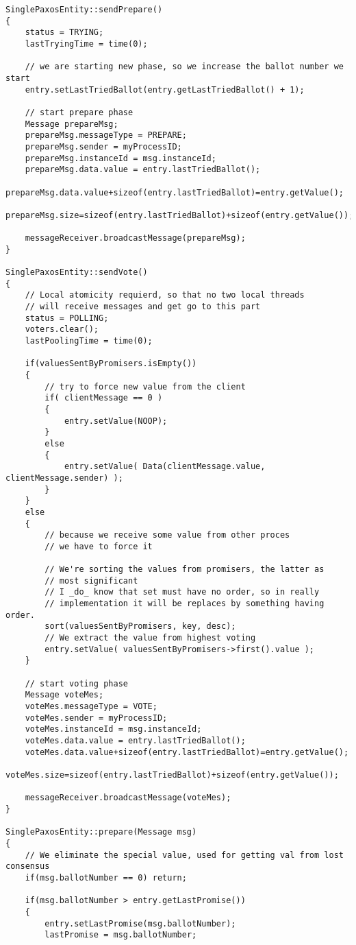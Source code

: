 {\begin{lstlisting}[frame=lines,caption=Pseudocode of Paxos algorithm]
SinglePaxosEntity::sendPrepare()
{
	status = TRYING;
	lastTryingTime = time(0);
	
	// we are starting new phase, so we increase the ballot number we start
	entry.setLastTriedBallot(entry.getLastTriedBallot() + 1);
	
	// start prepare phase
	Message prepareMsg;
	prepareMsg.messageType = PREPARE;
	prepareMsg.sender = myProcessID;
	prepareMsg.instanceId = msg.instanceId;
	prepareMsg.data.value = entry.lastTriedBallot();
	prepareMsg.data.value+sizeof(entry.lastTriedBallot)=entry.getValue();
	prepareMsg.size=sizeof(entry.lastTriedBallot)+sizeof(entry.getValue());
	
	messageReceiver.broadcastMessage(prepareMsg);
}

SinglePaxosEntity::sendVote()
{
	// Local atomicity requierd, so that no two local threads
	// will receive messages and get go to this part
	status = POLLING;   
	voters.clear();
	lastPoolingTime = time(0);
	
	if(valuesSentByPromisers.isEmpty())
	{
		// try to force new value from the client
		if( clientMessage == 0 )
		{
			entry.setValue(NOOP);
		}
		else
		{
			entry.setValue( Data(clientMessage.value, clientMessage.sender) );
		}
	}
	else
	{
		// because we receive some value from other proces
		// we have to force it
		
		// We're sorting the values from promisers, the latter as
		// most significant
		// I _do_ know that set must have no order, so in really
		// implementation it will be replaces by something having order.
		sort(valuesSentByPromisers, key, desc);
		// We extract the value from highest voting
		entry.setValue( valuesSentByPromisers->first().value );
	}
	
	// start voting phase
	Message voteMes;
	voteMes.messageType = VOTE;
	voteMes.sender = myProcessID;
	voteMes.instanceId = msg.instanceId;
	voteMes.data.value = entry.lastTriedBallot();
	voteMes.data.value+sizeof(entry.lastTriedBallot)=entry.getValue();
	voteMes.size=sizeof(entry.lastTriedBallot)+sizeof(entry.getValue());
	
	messageReceiver.broadcastMessage(voteMes);
}

SinglePaxosEntity::prepare(Message msg)
{
	// We eliminate the special value, used for getting val from lost consensus
	if(msg.ballotNumber == 0) return;
	
	if(msg.ballotNumber > entry.getLastPromise())
	{
		entry.setLastPromise(msg.ballotNumber);
		lastPromise = msg.ballotNumber;
		

\end{lstlisting}}
